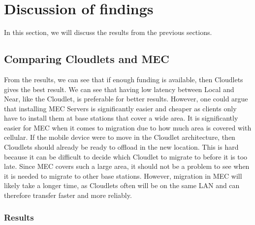 



\section{Discussion of findings}
In this section, we will discuss the results from the previous sections. 


\subsection{Comparing Cloudlets and MEC}
From the results, we can see that if enough funding is available, then Cloudlets gives the best result. We can see that having low latency between Local and Near, like the Cloudlet, is preferable for better results. However, one could argue that installing MEC Servers is significantly easier and cheaper as clients only have to install them at base stations that cover a wide area. It is significantly easier for MEC when it comes to migration due to how much area is covered with cellular. If the mobile device were to move in the Cloudlet architecture, then Cloudlets should already be ready to offload in the new location. This is hard because it can be difficult to decide which Cloudlet to migrate to before it is too late. Since MEC covers such a large area, it should not be a problem to see when it is needed to migrate to other base stations. However, migration in MEC will likely take a longer time, as Cloudlets often will be on the same LAN and can therefore transfer faster and more reliably.




\subsubsection{Results}

